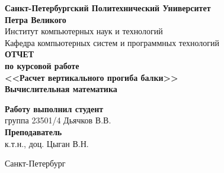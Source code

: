 \begin{titlepage}
\begin{center}
	\textbf{Санкт-Петербургский Политехнический Университет \\Петра Великого}\\[0.3cm]
	\small Институт компьютерных наук и технологий \\[0.3cm]
	\small Кафедра компьютерных систем и программных технологий\\[4cm]
	
	\textbf{ОТЧЕТ}\\ \textbf{по курсовой работе}\\[0.5cm]
	\textbf{<<Расчет вертикального прогиба балки>>}\\[0.1cm]
	\textbf{Вычислительная математика}\\[8.0cm]
\end{center}

\begin{flushright}
	\begin{minipage}{0.48\textwidth}
		\begin{flushleft}
			\small \textbf{Работу выполнил студент}\\[3mm]
			\small группа 23501/4 \hspace*{6mm} Дьячков В.В.\\[5mm]
			
			\small \textbf{Преподаватель}\\[5mm]
		 	\small \sign[3cm] \hspace*{5mm} к.т.н., доц. Цыган В.Н.\\[0.5cm]
		\end{flushleft}
	\end{minipage}
\end{flushright}

\vfill

\begin{center}
	\small Санкт-Петербург\\
	\small \the\year
\end{center}
\end{titlepage}